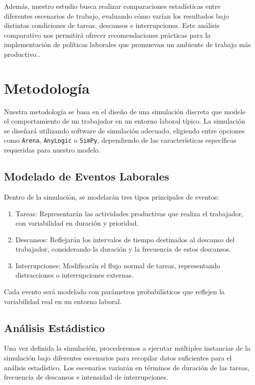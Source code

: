\documentclass[10pt,a4paper,twocolumn]{article}
\begin{document}
Además, nuestro estudio busca realizar comparaciones estadísticas entre diferentes escenarios de trabajo, evaluando cómo varían los resultados bajo distintas condiciones de tareas, descansos e interrupciones. Este análisis comparativo nos permitirá ofrecer recomendaciones prácticas para la implementación de políticas laborales que promuevan un ambiente de trabajo más productivo..

\section{Metodología} 
Nuestra metodología se basa en el diseño de una simulación discreta que modele el comportamiento de un trabajador en un entorno laboral típico. La simulación se diseñará utilizando software de simulación adecuado, eligiendo entre opciones como \texttt{Arena}, \texttt{AnyLogic} o \texttt{SimPy}, dependiendo de las características específicas requeridas para nuestro modelo.

\subsection{Modelado de Eventos Laborales}
Dentro de la simulación, se modelarán tres tipos principales de eventos:

\begin{enumerate}
    \item Tareas: Representarán las actividades productivas que realiza el trabajador, con variabilidad en duración y prioridad.
    \item Descansos: Reflejarán los intervalos de tiempo destinados al descanso del trabajador, considerando la duración y la frecuencia de estos descansos. 
    \item Interrupciones: Modificarán el flujo normal de tareas, representando distracciones o interrupciones externas.
\end{enumerate}

Cada evento será modelado con parámetros probabilísticos que reflejen la variabilidad real en un entorno laboral.

\subsection{An\'alisis Est\'adistico}

Una vez definida la simulación, procederemos a ejecutar múltiples instancias de la simulación bajo diferentes escenarios para recopilar datos suficientes para el análisis estadístico. Los escenarios variarán en términos de duración de las tareas, frecuencia de descansos e intensidad de interrupciones.
\end{document}
